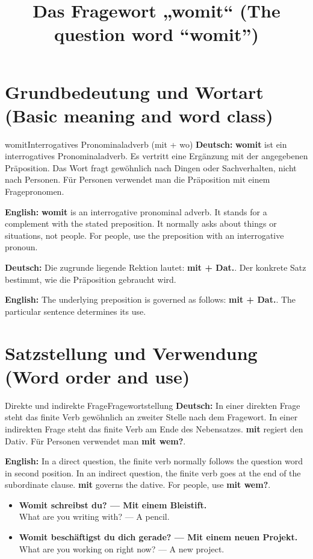 \documentclass[a4paper,11pt]{article}
\title{Das Fragewort „womit“ (The question word “womit”)}
\date{}
\newcommand{\GermanText}[1]{\textbf{Deutsch: }#1\par}
\newcommand{\EnglishText}[1]{{\small\color{SoftGray}\textbf{English: }#1\par}}
\newcommand{\ExampleItem}[2]{\item \textbf{#1}\\{\small\color{SoftGray}#2}}
\begin{document}
\maketitle
\tableofcontents
\newpage
\section{Grundbedeutung und Wortart (Basic meaning and word class)}
\begin{grammarentry}{womit}{Interrogatives Pronominaladverb (mit + wo)}
\GermanText{\textbf{womit} ist ein interrogatives Pronominaladverb. Es vertritt eine Ergänzung mit der angegebenen Präposition. Das Wort fragt gewöhnlich nach Dingen oder Sachverhalten, nicht nach Personen. Für Personen verwendet man die Präposition mit einem Fragepronomen.}
\EnglishText{\textbf{womit} is an interrogative pronominal adverb. It stands for a complement with the stated preposition. It normally asks about things or situations, not people. For people, use the preposition with an interrogative pronoun.}
\GermanText{Die zugrunde liegende Rektion lautet: \textbf{mit + Dat.}. Der konkrete Satz bestimmt, wie die Präposition gebraucht wird.}
\EnglishText{The underlying preposition is governed as follows: \textbf{mit + Dat.}. The particular sentence determines its use.}
\end{grammarentry}
\section{Satzstellung und Verwendung (Word order and use)}
\begin{grammarentry}{Direkte und indirekte Frage}{Fragewortstellung}
\GermanText{In einer direkten Frage steht das finite Verb gewöhnlich an zweiter Stelle nach dem Fragewort. In einer indirekten Frage steht das finite Verb am Ende des Nebensatzes. \textbf{mit} regiert den Dativ. Für Personen verwendet man \textbf{mit wem?}.}
\EnglishText{In a direct question, the finite verb normally follows the question word in second position. In an indirect question, the finite verb goes at the end of the subordinate clause. \textbf{mit} governs the dative. For people, use \textbf{mit wem?}.}
\end{grammarentry}
\begin{exbox}\begin{itemize}
\ExampleItem{Womit schreibst du? — Mit einem Bleistift.}{What are you writing with? — A pencil.}
\ExampleItem{Womit beschäftigst du dich gerade? — Mit einem neuen Projekt.}{What are you working on right now? — A new project.}
\end{itemize}\end{exbox}
\end{document}
